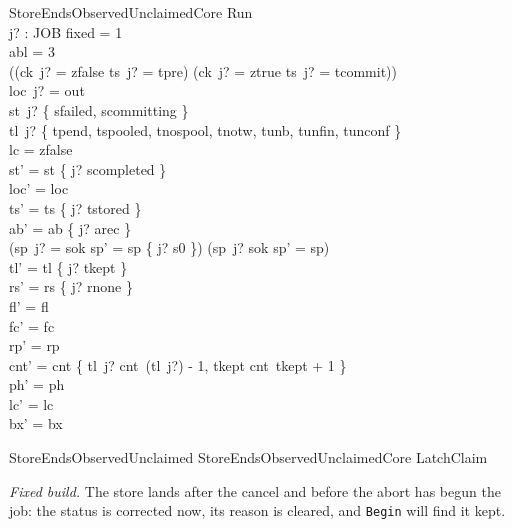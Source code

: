 \documentclass[a4paper,10pt,fleqn]{article}
\newcommand{\field}[1]{\texttt{#1}}
\begin{document}
\begin{schema}{StoreEndsObservedUnclaimedCore}
\Delta Run \\ j? : JOB
\where
fixed = 1 \\
abl = 3 \\
((ck~j? = zfalse \land ts~j? = tpre) \lor (ck~j? = ztrue \land ts~j? = tcommit)) \\
loc~j? = out \\
st~j? \in \{ sfailed, scommitting \} \\
tl~j? \in \{ tpend, tspooled, tnospool, tnotw, tunb, tunfin, tunconf \} \\
lc = zfalse \\
st' = st \oplus \{ j? \mapsto scompleted \} \\
loc' = loc \\
ts' = ts \oplus \{ j? \mapsto tstored \} \\
ab' = ab \oplus \{ j? \mapsto arec \} \\
(sp~j? = sok \implies sp' = sp \oplus \{ j? \mapsto s0 \}) \land (sp~j? \neq sok \implies sp' = sp) \\
tl' = tl \oplus \{ j? \mapsto tkept \} \\
rs' = rs \oplus \{ j? \mapsto rnone \} \\
fl' = fl \\
fc' = fc \\
rp' = rp \\
cnt' = cnt \oplus \{ tl~j? \mapsto cnt~(tl~j?) - 1, tkept \mapsto cnt~tkept + 1 \} \\
ph' = ph \\
lc' = lc \\
bx' = bx
\end{schema}

\begin{zed}
StoreEndsObservedUnclaimed  StoreEndsObservedUnclaimedCore \land LatchClaim
\end{zed}

\emph{Fixed build.} The store lands after the cancel and before the abort has
begun the job: the status is corrected now, its reason is cleared, and
\field{Begin} will find it kept.
\end{document}

